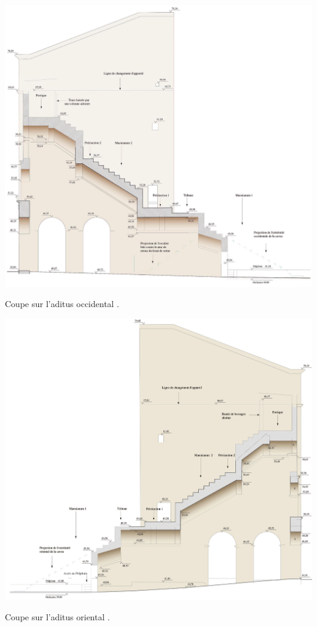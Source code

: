 \begin{figureth}
		\includegraphics[width=\linewidth]{images/aditusOccidental}
		\caption[Coupe sur l'\gls{aditus} occidental]{Coupe sur l'\gls{aditus} occidental \cite[Pl. XLVIII]{orangePl}.}
		\label{aditusOccidental}	
\end{figureth}

\begin{figureth}
		\includegraphics[width=\linewidth]{images/aditusOriental}
		\caption[Coupe sur l'\gls{aditus} oriental.]{Coupe sur l'\gls{aditus} oriental \cite[Pl. XLIX]{orangePl}.}
		\label{aditusOriental}
\end{figureth}

